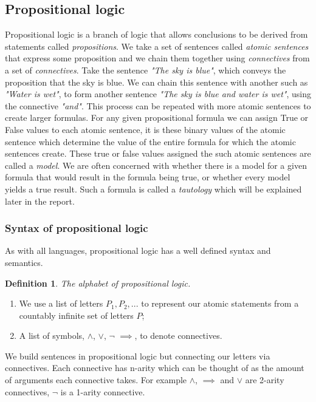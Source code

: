 \documentclass{article}%
\newtheorem{definition}{Definition}
\begin{document}
\subsection{Propositional logic}
Propositional logic is a branch of logic that allows conclusions to be derived from statements called \textit{propositions}. We take a set of sentences called \textit{atomic sentences} that express some proposition and we chain them together using \textit{connectives} from a set of \textit{connectives}. Take the sentence \textit{"The sky is blue"}, which conveys the proposition that the sky is blue. We can chain this sentence with another such as \textit{"Water is wet"}, to form another sentence \textit{"The sky is blue and water is wet"}, using the connective \textit{"and"}. This process can be repeated with more atomic sentences to create larger formulas. For any given propositional formula we can assign True or False values to each atomic sentence, it is these binary values of the atomic sentence which determine the value of the entire formula for which the atomic sentences create. These true or false values assigned the such atomic sentences are called a \textit{model}. We are often concerned with whether there is a model for a given formula that would result in the formula being true, or whether every model yields a true result. Such a formula is called a \textit{tautology} which will be explained later in the report. 
\subsubsection{Syntax of propositional logic}
As with all languages, propositional logic has a well defined syntax and semantics. 
\begin{definition}
The alphabet of propositional logic.
\end{definition}
\begin{enumerate}
\item We use a list of letters $P_1, P_2, ... $ to represent our atomic statements from a countably infinite set of letters $P$;
\item A list of symbols, $\land$, $\lor$, $\neg$  $\implies$, to denote connectives.
\end{enumerate}

We build sentences in propositional logic but connecting our letters via connectives. Each connective has n-arity which can be thought of as the amount of arguments each connective takes. For example $\land$, $\implies$ and $\lor$ are 2-arity connectives, $\neg$ is a 1-arity connective. 
 
\end{document}
